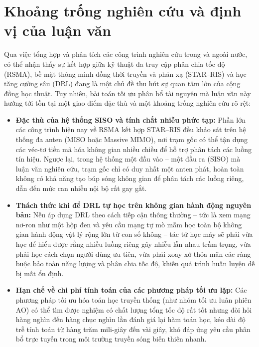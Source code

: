 \section{Khoảng trống nghiên cứu và định vị của luận văn}
\label{sec:khoang-trong}

Qua việc tổng hợp và phân tích các công trình nghiên cứu trong và ngoài nước, có thể nhận thấy sự kết hợp
giữa kỹ thuật đa truy cập phân chia tốc độ (RSMA), bề mặt thông minh đồng thời truyền và phản xạ
(STAR--RIS) và học tăng cường sâu (DRL) đang là một chủ đề thu hút sự quan tâm lớn của cộng đồng học thuật.
Tuy nhiên, bài toán tối ưu phân bổ tài nguyên mà luận văn này hướng tới tồn tại một giao điểm đặc thù và
một khoảng trống nghiên cứu rõ rệt:
\begin{itemize}
\item \textbf{Đặc thù của hệ thống SISO và tính chất nhiễu phức tạp:} Phần lớn các công trình hiện nay về
  RSMA kết hợp STAR--RIS đều khảo sát trên hệ thống đa anten (MISO hoặc Massive MIMO), nơi trạm gốc có thể
  tận dụng các véc-tơ tiền mã hóa không gian nhiều chiều để hỗ trợ phân tách các luồng tín hiệu. Ngược lại,
  trong hệ thống một đầu vào -- một đầu ra (SISO) mà luận văn nghiên cứu, trạm gốc chỉ có duy nhất một anten
  phát, hoàn toàn không có khả năng tạo búp sóng không gian để phân tách các luồng riêng, dẫn đến mức can
  nhiễu nội bộ rất gay gắt.
\item \textbf{Thách thức khi để DRL tự học trên không gian hành động nguyên bản:} Nếu áp dụng DRL theo cách
  tiếp cận thông thường -- tức là xem mạng nơ-ron như một hộp đen và yêu cầu mạng tự mò mẫm học toàn bộ không
  gian hành động vật lý rộng lớn từ con số không -- tác tử học máy sẽ phải vừa học để hiểu được rằng nhiều
  luồng riêng gây nhiễu lẫn nhau trầm trọng, vừa phải học cách chọn người dùng ưu tiên, vừa phải xoay xở
  thỏa mãn các ràng buộc bảo toàn năng lượng và phân chia tốc độ, khiến quá trình huấn luyện dễ bị mất ổn
  định.
\item \textbf{Hạn chế về chi phí tính toán của các phương pháp tối ưu lặp:} Các phương pháp tối ưu hóa toán
  học truyền thống (như nhóm tối ưu luân phiên AO) có thể tìm được nghiệm có chất lượng tổng tốc độ rất tốt
  nhưng đòi hỏi hàng nghìn đến hàng chục nghìn lần đánh giá lại hàm toán học, kéo dài độ trễ tính toán từ
  hàng trăm mili-giây đến vài giây, khó đáp ứng yêu cầu phân bổ trực tuyến trong môi trường truyền sóng biến
  thiên nhanh.
\end{itemize}

